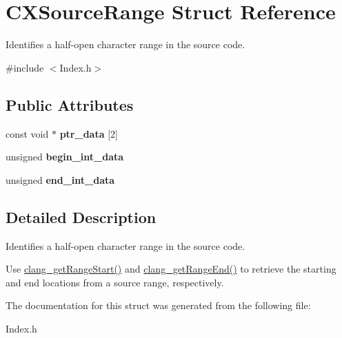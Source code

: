 \hypertarget{structCXSourceRange}{}\section{C\+X\+Source\+Range Struct Reference}
\label{structCXSourceRange}


Identifies a half-\/open character range in the source code.  




{\ttfamily \#include $<$Index.\+h$>$}

\subsection*{Public Attributes}
\begin{DoxyCompactItemize}
\item 
\mbox{\label{structCXSourceRange_a370a86ac6ac3ecf5c668b7e4f0a1366e}} 
const void $\ast$ {\bfseries ptr\+\_\+data} \mbox{[}2\mbox{]}
\item 
\mbox{\label{structCXSourceRange_a9ea78e31b552c79a8823690275c86165}} 
unsigned {\bfseries begin\+\_\+int\+\_\+data}
\item 
\mbox{\label{structCXSourceRange_ab223a601843114cb35a96dbcf1877093}} 
unsigned {\bfseries end\+\_\+int\+\_\+data}
\end{DoxyCompactItemize}


\subsection{Detailed Description}
Identifies a half-\/open character range in the source code. 

Use \hyperlink{group__CINDEX__LOCATIONS_gac2cc034e3965739c41662f6ada7ff248}{clang\+\_\+get\+Range\+Start()} and \hyperlink{group__CINDEX__LOCATIONS_gacdb7d3c2b77a06bcc2e83bde3e14c3c0}{clang\+\_\+get\+Range\+End()} to retrieve the starting and end locations from a source range, respectively. 

The documentation for this struct was generated from the following file\+:\begin{DoxyCompactItemize}
\item 
Index.\+h\end{DoxyCompactItemize}
